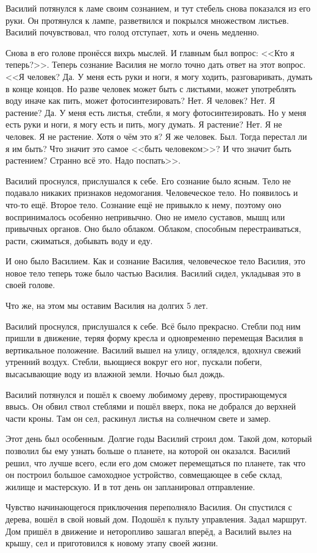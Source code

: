 \documentclass[12pt]{article}
\begin{document}
Василий потянулся к ламе своим сознанием, и тут стебель снова показался
из его руки. Он протянулся к лампе, разветвился и покрылся множеством
листьев. Василий почувствовал, что голод отступает, хоть и очень медленно.

Снова в его голове пронёсся вихрь мыслей. И главным был вопрос:
<<Кто я теперь?>>. Теперь сознание Василия не могло точно дать ответ
на этот вопрос. <<Я человек? Да. У меня есть руки и ноги, я могу ходить,
разговаривать, думать в конце концов. Но разве человек может быть с листьями,
может употреблять воду иначе как пить, может фотосинтезировать? Нет.
Я человек? Нет. Я растение? Да. У меня есть листья, стебли, я могу
фотосинтезировать. Но у меня есть руки и ноги, я могу есть и пить, могу
думать. Я растение? Нет. Я не человек. Я не растение. Хотя о чём это я?
Я же человек. Был. Тогда перестал ли я им быть? Что значит это самое
<<быть человеком>>? И что значит быть растением? Странно всё это.
Надо поспать>>.


Василий проснулся, прислушался к себе. Его сознание было ясным. Тело
не подавало никаких признаков недомогания. Человеческое тело.
Но появилось и что-то ещё. Второе тело. Сознание ещё не привыкло к нему,
поэтому оно воспринималось особенно непривычно. Оно не имело суставов,
мышц или привычных органов. Оно было облаком. Облаком, способным
перестраиваться, расти, сжиматься, добывать воду и еду.

И оно было Василием. Как и сознание Василия, человеческое тело Василия,
это новое тело теперь тоже было частью Василия. Василий сидел, укладывая
это в своей голове.

Что же, на этом мы оставим Василия на долгих 5 лет.


Василий проснулся, прислушался к себе. Всё было прекрасно. Стебли под ним
пришли в движение, теряя форму кресла и одновременно перемещая Василия в
вертикальное положение. Василий вышел на улицу, огляделся, вдохнул
свежий утренний воздух. Стебли, вьющиеся вокруг его ног, пускали побеги,
высасывающие воду из влажной земли. Ночью был дождь.

Василий потянулся и пошёл к своему любимому дереву, простирающемуся ввысь.
Он обвил ствол стеблями и пошёл вверх, пока не добрался до верхней части
кроны. Там он сел, раскинул листья на солнечном свете и замер.

Этот день был особенным. Долгие годы Василий строил дом. Такой дом,
который позволил бы ему узнать больше о планете, на которой он оказался.
Василий решил, что лучше всего, если его дом сможет перемещаться по планете,
так что он построил большое самоходное устройство, совмещающее в себе
склад, жилище и мастерскую. И в тот день он запланировал отправление.

Чувство начинающегося приключения переполняло Василия. Он спустился с
дерева, вошёл в свой новый дом. Подошёл к пульту управления. Задал маршрут.
Дом пришёл в движение и неторопливо зашагал вперёд, а Василий вылез на крышу,
сел и приготовился к новому этапу своей жизни.
\end{document}
